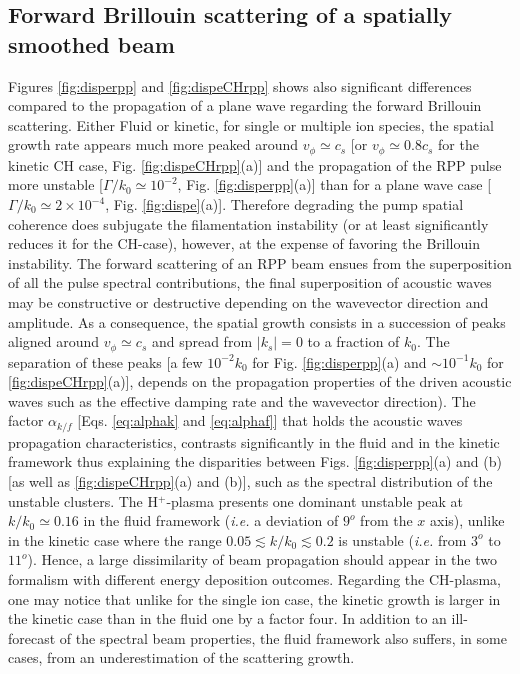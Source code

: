 \documentclass[
 reprint,
 amsmath,amssymb,
 aps,
]{revtex4-1}
\begin{document}
\subsection{Forward Brillouin scattering of a  spatially smoothed beam}
Figures \ref{fig:disperpp} and \ref{fig:dispeCHrpp} shows also significant differences compared to the propagation of a plane wave  regarding the forward Brillouin scattering.  
Either Fluid or kinetic, for single or multiple ion species, 
the spatial growth rate appears much more peaked around $v_\phi\simeq c_s$ [or $v_\phi\simeq 0.8c_s$ for  the kinetic CH case, Fig. \ref{fig:dispeCHrpp}(a)] and the propagation of the RPP pulse more unstable  [$\Gamma/k_0\simeq  10^{-2}$, Fig.  \ref{fig:disperpp}(a)]  than for a plane wave case  [$\Gamma/k_0\simeq 2 \times 10^{-4}$, Fig.  \ref{fig:dispe}(a)].
Therefore degrading the pump spatial coherence does subjugate the filamentation instability (or at least significantly reduces it for the CH-case), however, at the expense of favoring the Brillouin instability.
The forward scattering of an RPP beam ensues from the superposition of all the pulse spectral contributions, the final superposition of acoustic waves may be constructive or destructive depending on the wavevector direction and amplitude. As a consequence, the spatial growth consists in a succession of peaks aligned around $v_\phi\simeq c_s$ and spread from $\vert k_s\vert=0$ to a fraction of $k_0$. The separation of these peaks [a few $ 10^{-2}k_0$ for Fig. \ref{fig:disperpp}(a) and $\sim 10^{-1}k_0$ for \ref{fig:dispeCHrpp}(a)], depends on the propagation properties of the driven acoustic waves such as the effective damping rate and the wavevector direction). 
The factor $\alpha_{k/f}$ [Eqs. \eqref{eq:alphak} and  \eqref{eq:alphaf}] that  holds the acoustic waves propagation characteristics, contrasts  significantly in the fluid and in the kinetic framework  thus explaining the disparities between Figs. \ref{fig:disperpp}(a) and (b) [as well as  \ref{fig:dispeCHrpp}(a) and (b)], such as the spectral distribution of the unstable clusters. 
The H$^+$-plasma presents one dominant unstable peak at $k/k_0\simeq 0.16$  in the fluid framework (\emph{i.e.} a deviation of $9^o$ from the $x$ axis), unlike in the kinetic case where the range  $0.05 \lesssim k/k_0\lesssim 0.2$ is unstable (\emph{i.e.} from  $3^o$ to $11^o$). Hence, a large dissimilarity of beam propagation  should appear in the two formalism  with different energy deposition outcomes. Regarding the CH-plasma, one may notice that unlike for the single ion case, the kinetic growth  is larger in the kinetic case than in the fluid one by a factor four. In addition to an ill-forecast  of the spectral beam properties, the fluid framework also suffers, in some cases, from an underestimation of the scattering growth. 
\end{document}
